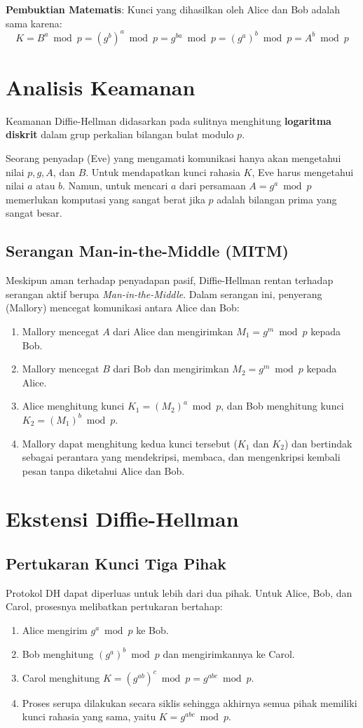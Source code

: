 \documentclass[../main.tex]{subfiles}
\begin{document}
\textbf{Pembuktian Matematis}:
Kunci yang dihasilkan oleh Alice dan Bob adalah sama karena:
\[ K = B^a \bmod p = (g^b)^a \bmod p = g^{ba} \bmod p = (g^a)^b \bmod p = A^b \bmod p \]

\section{Analisis Keamanan}
Keamanan Diffie-Hellman didasarkan pada sulitnya menghitung \textbf{logaritma diskrit} dalam grup perkalian bilangan bulat modulo $p$.

Seorang penyadap (Eve) yang mengamati komunikasi hanya akan mengetahui nilai $p, g, A$, dan $B$. Untuk mendapatkan kunci rahasia $K$, Eve harus mengetahui nilai $a$ atau $b$. Namun, untuk mencari $a$ dari persamaan $A = g^a \bmod p$ memerlukan komputasi yang sangat berat jika $p$ adalah bilangan prima yang sangat besar.

\subsection{Serangan Man-in-the-Middle (MITM)}
Meskipun aman terhadap penyadapan pasif, Diffie-Hellman rentan terhadap serangan aktif berupa \textit{Man-in-the-Middle}. Dalam serangan ini, penyerang (Mallory) mencegat komunikasi antara Alice dan Bob:
\begin{enumerate}
    \item Mallory mencegat $A$ dari Alice dan mengirimkan $M_1 = g^m \bmod p$ kepada Bob.
    \item Mallory mencegat $B$ dari Bob dan mengirimkan $M_2 = g^m \bmod p$ kepada Alice.
    \item Alice menghitung kunci $K_1 = (M_2)^a \bmod p$, dan Bob menghitung kunci $K_2 = (M_1)^b \bmod p$.
    \item Mallory dapat menghitung kedua kunci tersebut ($K_1$ dan $K_2$) dan bertindak sebagai perantara yang mendekripsi, membaca, dan mengenkripsi kembali pesan tanpa diketahui Alice dan Bob.
\end{enumerate}

\section{Ekstensi Diffie-Hellman}
\subsection{Pertukaran Kunci Tiga Pihak}
Protokol DH dapat diperluas untuk lebih dari dua pihak. Untuk Alice, Bob, dan Carol, prosesnya melibatkan pertukaran bertahap:
\begin{enumerate}
    \item Alice mengirim $g^a \bmod p$ ke Bob.
    \item Bob menghitung $(g^a)^b \bmod p$ dan mengirimkannya ke Carol.
    \item Carol menghitung $K = (g^{ab})^c \bmod p = g^{abc} \bmod p$.
    \item Proses serupa dilakukan secara siklis sehingga akhirnya semua pihak memiliki kunci rahasia yang sama, yaitu $K = g^{abc} \bmod p$.
\end{enumerate}
\end{document}
